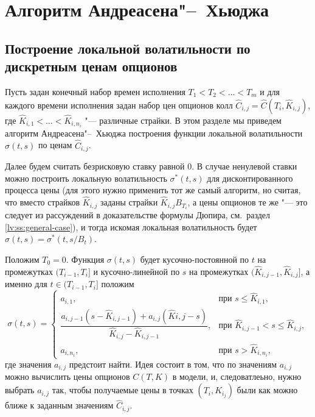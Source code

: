 \section{Алгоритм Андреасена"--~Хьюджа}
\label{lv:s:ah}
\subsection{Построение локальной волатильности по дискретным ценам опционов}
Пусть задан конечный набор времен исполнения $T_1<T_2<\ldots<T_m$ и для каждого времени исполнения задан набор цен опционов колл $\hat C_{i,j}=\hat C(T_i, \hat K_{i,j})$, где $\hat K_{i,1} < \ldots < \hat K_{i,n_i}$ "--- различные страйки.
В этом разделе мы приведем алгоритм Андреасена"--~Хьюджа \cite{AndreasenHuge10} построения функции локальной волатильности $\sigma(t,s)$ по ценам $\hat C_{i,j}$.

Далее будем считать безрисковую ставку равной 0.
В случае ненулевой ставки можно построить локальную волатильность $\sigma^*(t,s)$ для дисконтированного процесса цены (для этого нужно применить тот же самый алгоритм, но считая, что вместо страйков $\hat K_{i,j}$ заданы страйки $\hat K_{i,j} B_{T_i}$, а цены опционов те же "--- это следует из рассуждений в доказательстве формулы Дюпира, см.~раздел \ref{lv:ss:general-case}), и тогда искомая локальная волатильность будет $\sigma(t,s) = \sigma^*(t,s/B_t)$. 

Положим $T_0=0$.
Функция $\sigma(t,s)$ будет кусочно-постоянной по $t$ на промежутках $(T_{i-1}, T_i]$ и кусочно-линейной по $s$ на промежутках $(\hat K_{i,j-1}, \hat K_{i,j}]$, а именно для $t\in (T_{i-1}, T_i]$ положим
\[
\sigma(t, s) = \begin{cases}
a_{i,1}, 
  &\text{при } s\le \hat K_{i,1},\\
\dfrac{a_{i,j-1}(s-\hat K_{i,j-1}) + a_{i,j}(\hat K{i,j} - s)}{\hat K_{i,j}-\hat K_{i,j-1}}, 
  &\text{при } \hat K_{i,j-1}< s \le \hat K_{i,j},\\
a_{i,n_i}, 
  &\text{при } s> \hat K_{i,n_i},
\end{cases}
\]
где значения $a_{i,j}$ предстоит найти.
Идея состоит в том, что по значениям $a_{i,j}$ можно вычислить цены опционов $C(T, K)$ в модели, и, следоватлеьно, нужно выбрать $a_{i,j}$ так, чтобы получаемые цены в точках $(T_i, K_{i_j})$ были как можно ближе к заданным значениям $\hat C_{i,j}$.


